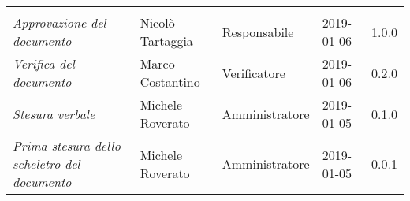 \newpage 
\section*{}
\begin{table}[H]
	\centering
	\begin{tabular}{p{4cm}|C{3cm}|C{3cm}|R{2.5cm}|R{2cm}}
		
		 & & & & \\
		
		
		\emph{Approvazione del documento} &  Nicolò Tartaggia & Responsabile & 2019-01-06 & 1.0.0 \\
		\hline
		
		\emph{Verifica del documento} & Marco Costantino & Verificatore & 2019-01-06 & 0.2.0 \\
		\hline

		\emph{Stesura verbale} & Michele Roverato & Amministratore & 2019-01-05 & 0.1.0 \\
		\hline
		
		\emph{Prima stesura dello scheletro del documento} & Michele Roverato & Amministratore & 2019-01-05 & 0.0.1 \\
		
	\end{tabular}
	
\end{table}


\clearpage